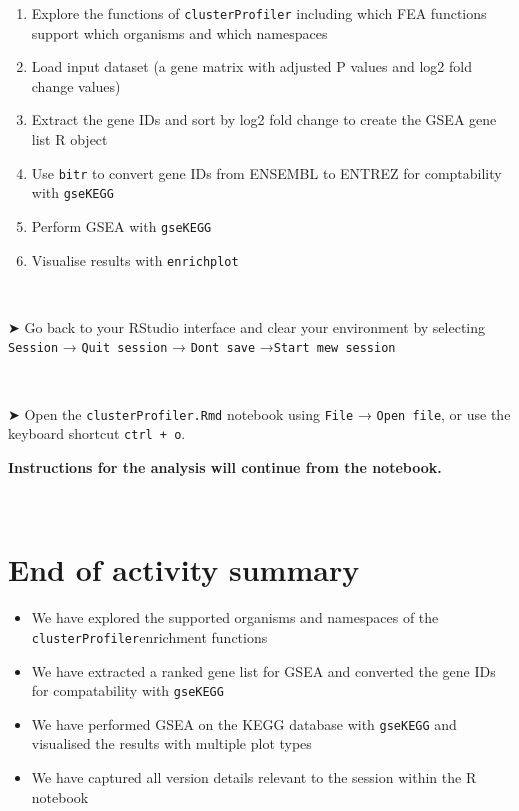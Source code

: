 \documentclass[
]{book}
\providecommand{\tightlist}{%
  \setlength{\itemsep}{0pt}\setlength{\parskip}{0pt}}
\begin{document}
\begin{enumerate}
\def\labelenumi{\arabic{enumi}.}
\tightlist
\item
  Explore the functions of \texttt{clusterProfiler} including which FEA functions support which organisms and which namespaces
\item
  Load input dataset (a gene matrix with adjusted P values and log2 fold change values)
\item
  Extract the gene IDs and sort by log2 fold change to create the GSEA gene list R object
\item
  Use \texttt{bitr} to convert gene IDs from ENSEMBL to ENTREZ for comptability with \texttt{gseKEGG}
\item
  Perform GSEA with \texttt{gseKEGG}
\item
  Visualise results with \texttt{enrichplot}
\end{enumerate}

~

➤ Go back to your RStudio interface and clear your environment by selecting \texttt{Session} → \texttt{Quit\ session} → \texttt{Dont\ save} →\texttt{Start\ mew\ session}

~

➤ Open the \texttt{clusterProfiler.Rmd} notebook using \texttt{File} → \texttt{Open\ file}, or use the keyboard shortcut \texttt{ctrl\ +\ o}.

\textbf{Instructions for the analysis will continue from the notebook.}

~

\hypertarget{end-of-activity-summary-1}{%
\section{End of activity summary}\label{end-of-activity-summary-1}}

\begin{itemize}
\tightlist
\item
  We have explored the supported organisms and namespaces of the \texttt{clusterProfiler}enrichment functions
\item
  We have extracted a ranked gene list for GSEA and converted the gene IDs for compatability with \texttt{gseKEGG}
\item
  We have performed GSEA on the KEGG database with \texttt{gseKEGG} and visualised the results with multiple plot types
\item
  We have captured all version details relevant to the session within the R notebook
\end{itemize}
\end{document}
